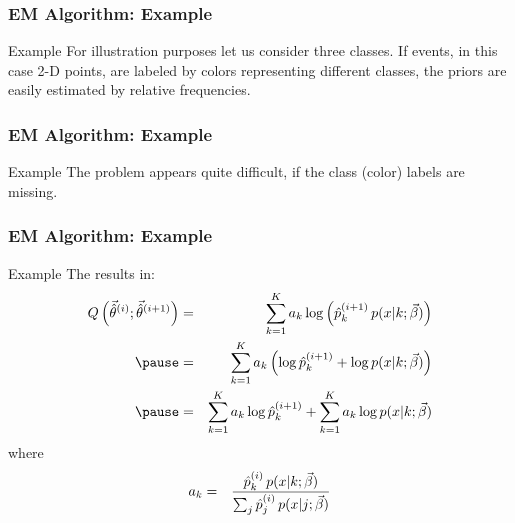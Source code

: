 \begin{frame}
  \frametitle{EM Algorithm: Example \cont}

  \begin{ovalblock}{Example}
    \small
    For illustration purposes let us consider three classes.
    If events, in this case 2-D points, are labeled by colors representing different classes, the priors are easily estimated by relative frequencies.

    \begin{center}
      \resizebox{.45\linewidth}{!}{
        
      }
    \end{center}
  \end{ovalblock}
\end{frame}


\begin{frame}
  \frametitle{EM Algorithm: Example \cont}

  \begin{ovalblock}{Example \cont}
    \small
    The problem appears quite difficult, if the class (color) labels are missing.

    \begin{center}
      \resizebox{.45\linewidth}{!}{
        
      }
    \end{center}
  \end{ovalblock}
\end{frame}


\begin{frame}
  \frametitle{EM Algorithm: Example \cont}

  \begin{ovalblock}{Example}
    \small
    The  results in:
    {\footnotesize
      \begin{eqnarray*}
        Q\left( \hatp^{(i)}; \hatp^{(i+1)} \right) 
          &=& \sum_{k=1}^{K} a_k \log \left( \hat{p}_k^{(i+1)} \, p(x|k;\BiasField) \right) \\ \pause 
          &=& \sum_{k=1}^{K} a_k \left( \log \hat{p}_k^{(i+1)} + \log p(x|k; \BiasField) \right) \\ \pause 
          &=& \sum_{k=1}^{K} a_k \log \hat{p}_k^{(i+1)} +
              \sum_{k=1}^{K} a_k \log p(x|k;\BiasField)
      \end{eqnarray*}
    }
    where
    {\footnotesize
      \begin{eqnarray*}
        a_k
          &=& \frac{\hat{p}_k^{(i)} \, p(x|k; \vec{\beta})}
                   {\sum_{j}\hat{p}_j^{(i)} \, p(x|j; \vec{\beta})}
      \end{eqnarray*} \vspace{-.2cm}
    }
  \end{ovalblock}
\end{frame}


